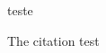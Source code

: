 \documentclass{beamer}
\begin{document}
\begin{frame}

teste \cite{Morettin09}

The citation test \cite{roteiro}\\
\end{frame}

\begin{frame}
\printbibliography
\end{frame}
\end{document}
